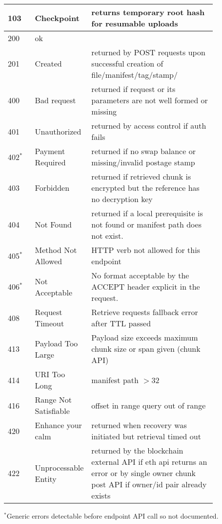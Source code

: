 \begin{definition}
\begin{tabular}{l|p{0.25\linewidth}|p{0.6\linewidth}}
103 & Checkpoint & returns temporary root hash for resumable uploads
\\\hline
200 & ok &
\\
201 & Created & returned by POST requests upon successful creation of file/manifest/tag/stamp/
\\\hline
400 & Bad request & returned if request or its parameters are not well formed or missing
\\
401 & Unauthorized & returned by access control if auth fails
\\
402$^{*}$ & Payment Required & returned if no swap balance or missing/invalid postage stamp
\\
403 & Forbidden & returned if retrieved chunk is encrypted  but the reference has no decryption key
\\     
404 & Not Found &
returned if a local prerequisite is not found or manifest path does not exist.
\\
405$^{*}$& Method Not Allowed & HTTP verb  not allowed for this endpoint
\\
406$^{*}$
%
& Not Acceptable & No format acceptable by the {ACCEPT} header explicit in the request. 
\\
408 & Request Timeout & Retrieve requests fallback error after TTL passed
\\
413 & Payload Too Large  &
Payload size exceeds maximum chunk size or span given (chunk API)
\\
414 & URI Too Long  & manifest path  $>32 $
\\
416 & Range Not Satisfiable  & offset in range query out of range
\\
420 & Enhance your calm & returned when recovery was initiated but retrieval timed out
\\
422 & Unprocessable Entity & returned by the blockchain external API if eth api returns an error or by single owner chunk post API if owner/id pair already exists
\end{tabular}

\footnotesize{$^{*}$Generic errors detectable before endpoint API call so not documented.}
\end{definition}



